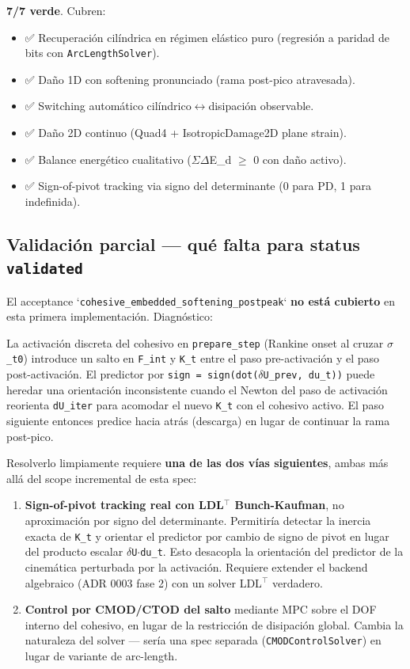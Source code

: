 \documentclass[11pt,letterpaper,oneside]{report}
\begin{document}
\textbf{7/7 verde}. Cubren:

\begin{itemize}
  \item ✅ Recuperación cilíndrica en régimen elástico puro (regresión a paridad de bits con \texttt{ArcLengthSolver}).
  \item ✅ Daño 1D con softening pronunciado (rama post-pico atravesada).
  \item ✅ Switching automático cilíndrico\ensuremath{\leftrightarrow}disipación observable.
  \item ✅ Daño 2D continuo (Quad4 + IsotropicDamage2D plane strain).
  \item ✅ Balance energético cualitativo (\ensuremath{\Sigma}\ensuremath{\Delta}E\_d \ensuremath{\ge} 0 con daño activo).
  \item ✅ Sign-of-pivot tracking via signo del determinante (0 para PD, 1 para indefinida).
\end{itemize}

\subsection{Validación parcial --- qué falta para status \texttt{validated}}

El acceptance `\texttt{cohesive\_embedded\_softening\_postpeak}` \textbf{no está cubierto} en esta primera implementación. Diagnóstico:

La activación discreta del cohesivo en \texttt{prepare\_step} (Rankine onset al cruzar \texttt{\ensuremath{\sigma}\_t0}) introduce un salto en \texttt{F\_int} y \texttt{K\_t} entre el paso pre-activación y el paso post-activación. El predictor por \texttt{sign = sign(dot(\ensuremath{\delta}U\_prev, du\_t))} puede heredar una orientación inconsistente cuando el Newton del paso de activación reorienta \texttt{dU\_iter} para acomodar el nuevo \texttt{K\_t} con el cohesivo activo. El paso siguiente entonces predice hacia atrás (descarga) en lugar de continuar la rama post-pico.

Resolverlo limpiamente requiere \textbf{una de las dos vías siguientes}, ambas más allá del scope incremental de esta spec:

\begin{enumerate}
  \item \textbf{Sign-of-pivot tracking real con LDL\ensuremath{^{\top}} Bunch-Kaufman}, no aproximación por signo del determinante. Permitiría detectar la inercia exacta de \texttt{K\_t} y orientar el predictor por cambio de signo de pivot en lugar del producto escalar \texttt{\ensuremath{\delta}U\ensuremath{\cdot}du\_t}. Esto desacopla la orientación del predictor de la cinemática perturbada por la activación. Requiere extender el backend algebraico (ADR 0003 fase 2) con un solver LDL\ensuremath{^{\top}} verdadero.
  \item \textbf{Control por CMOD/CTOD del salto} mediante MPC sobre el DOF interno del cohesivo, en lugar de la restricción de disipación global. Cambia la naturaleza del solver --- sería una spec separada (\texttt{CMODControlSolver}) en lugar de variante de arc-length.
\end{enumerate}
\end{document}
